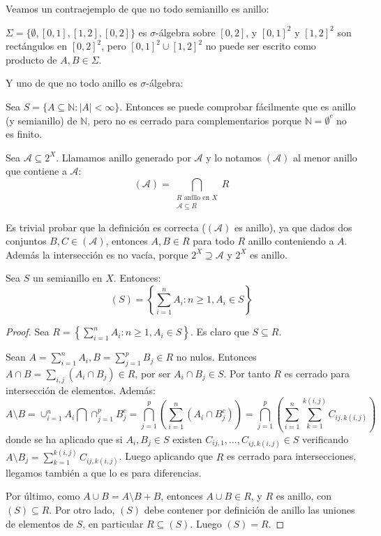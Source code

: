 \begin{counterex}
 Veamos un contraejemplo de que no todo semianillo es anillo:
 
 $\Sigma = \{\emptyset, [0,1], [1,2], [0,2]\}$ es $\sigma$-álgebra sobre $[0,2]$, y $[0,1]^2$ y $[1,2]^2$ son rectángulos
 en $[0,2]^2$, pero $[0,1]^2 \cup [1,2]^2$ no puede ser escrito como producto de $A,B \in \Sigma$.
 
 Y uno de que no todo anillo es $\sigma$-álgebra:
 
 Sea $S = \{A\subseteq \mathbb{N}: |A| < \infty\}$. Entonces se puede comprobar fácilmente que es anillo (y semianillo)
 de $\mathbb{N}$, pero no es cerrado para complementarios porque $\mathbb{N} = \emptyset^c$ no es finito.
\end{counterex}


\begin{definition}
 Sea $\mathcal{A} \subseteq 2^X$. Llamamos anillo generado por $\mathcal{A}$ y lo notamos $(\mathcal{A})$ al
 menor anillo que contiene a $\mathcal{A}$:
 \[
   (\mathcal{A}) = \bigcap_{\begin{array}{c}R \textrm{ anillo en } X\\ \mathcal{A}\subseteq R \end{array}} R
 \]
\end{definition}

Es trivial probar que la definición es correcta ($(\mathcal{A})$ es anillo), ya que dados dos 
conjuntos $B,C \in (\mathcal{A})$, entonces $A, B \in R$ para todo $R$ anillo conteniendo a $A$. Además la
intersección es no vacía, porque $2^X \supseteq \mathcal{A}$ y $2^X$ es anillo.

\begin{fact}
 Sea $S$ un semianillo en $X$. Entonces:
 \[
   (S) = \left\{\sum_{i=1}^n A_i:  n\ge 1, A_i \in S\right\}
 \]
 \label{claim:semiring}
\end{fact}

  \begin{proof}
   Sea $R= \left\{\sum_{i=1}^n A_i:  n\ge 1, A_i \in S\right\}$. Es claro que $S\subseteq R$.
   
   Sean $A = \sum_{i=1}^n A_i, B = \sum_{j=1}^p B_j \in R$ no nulos. Entonces 
   $A\cap B = \sum_{i,j} (A_i \cap B_j)\in R$, por ser $A_i\cap B_j \in S$. Por tanto $R$ es cerrado para intersección de 
   elementos. Además:
    \[
      A\setminus B = \cup_{i=1}^n A_i \bigcap \cap_{j=1}^p B_j^c = \bigcap_{j=1}^p 
                     \left(\sum_{i=1}^n (A_i \cap B_j^c)\right) = 
                     \bigcap_{j=1}^p \left(\sum_{i=1}^n \sum_{k=1}^{k(i,j)} C_{ij,k(i,j)} \right)
    \]
   donde se ha aplicado que si $A_i, B_j \in S$ existen $C_{ij,1}, \ldots, C_{ij,k(i,j)} \in S$ verificando
   $A\setminus B_j =\sum_{k=1}^{k(i,j)} C_{ij,k(i,j)}$. Luego aplicando que $R$ es cerrado para intersecciones, 
   llegamos también a que lo es para diferencias.
   
   Por último, como $A\cup B = A \setminus B + B$, entonces $A \cup B \in R$, y $R$ es anillo, con $(S) \subseteq R$.
   Por otro lado, $(S)$ debe contener por definición de anillo las uniones de elementos de $S$, en particular
   $R\subseteq (S)$. Luego $(S) = R$.
  \end{proof}


